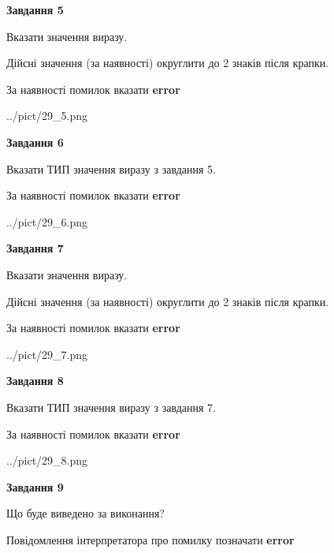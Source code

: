\documentclass[11pt, ukrainian]{article}
\begin{document}
{\begin {large}
{\begin {center}\textbf{Завдання 5}\end {center}}\par
Вказати значення виразу. \par
Дійсні значення (за наявності) округлити до 2 знаків після крапки. \par
За наявності помилок вказати \textbf{error}

\begin{center}
	{../pict/29_5.png}
\end{center}
\newpage

{\begin {center}\textbf{Завдання 6}\end {center}}\par
Вказати ТИП значення виразу з завдання 5. \par
За наявності помилок вказати \textbf{error}

\begin{center}
	{../pict/29_6.png}
\end{center}
\newpage

{\begin {center}\textbf{Завдання 7}\end {center}}\par
Вказати значення виразу. \par
Дійсні значення (за наявності) округлити до 2 знаків після крапки. \par
За наявності помилок вказати \textbf{error}

\begin{center}
	{../pict/29_7.png}
\end{center}
\newpage

{\begin {center}\textbf{Завдання 8}\end {center}}\par
Вказати ТИП значення виразу з завдання 7. \par
За наявності помилок вказати \textbf{error}

\begin{center}
	{../pict/29_8.png}
\end{center}
\newpage

{\begin {center}\textbf{Завдання 9}\end {center}}\par
Що буде виведено за виконання? \par
Повідомлення інтерпретатора про помилку позначати \textbf{error}


\end{large}}
\end{document}
